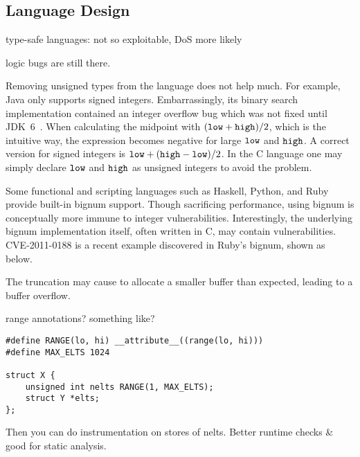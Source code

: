 \subsection{Language Design}

type-safe languages: not so exploitable, DoS more likely

logic bugs are still there.

Removing unsigned types from the language does not help much.  For
example, Java only supports signed integers.  Embarrassingly, its
binary search implementation contained an integer overflow bug which
was not fixed until JDK~6~\cite{java-bsearch}.  When calculating
the midpoint with $(\texttt{low} + \texttt{high})/2$, which is the intuitive
way, the expression becomes negative for large $\texttt{low}$ and
$\texttt{high}$.  A correct version for signed integers is $\texttt{low} +
(\texttt{high}-\texttt{low})/2$.  In the C language one may simply declare
$\texttt{low}$ and $\texttt{high}$ as unsigned integers to avoid the problem.


Some functional and scripting languages such as Haskell,
Python, and Ruby provide built-in bignum support. Though sacrificing
performance, using bignum is conceptually more immune to integer
vulnerabilities.
%
Interestingly, the underlying bignum implementation itself,
often written in C, may contain vulnerabilities.
CVE-2011-0188 is a recent example discovered in Ruby's bignum,
shown as below.

The truncation may cause  to allocate a smaller buffer
than expected, leading to a buffer overflow.

range annotations?  something like?
\begin{Verbatim}
#define RANGE(lo, hi) __attribute__((range(lo, hi)))
#define MAX_ELTS 1024

struct X {
	unsigned int nelts RANGE(1, MAX_ELTS);
	struct Y *elts;
};
\end{Verbatim}
Then you can do instrumentation on stores of nelts.
Better runtime checks \& good for static analysis.
\fi
